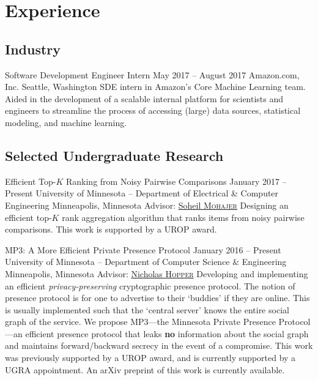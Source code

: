 \section{Experience}
\subsection{Industry}
\block
  {Software Development Engineer Intern}
  {May 2017 -- August 2017}
  {Amazon.com, Inc.}
  {Seattle, Washington}
  {}
  {
    SDE intern in Amazon's Core Machine Learning team. Aided in the development
    of a scalable internal platform for scientists and engineers to streamline
    the process of accessing (large) data sources, statistical modeling, and
    machine learning.
  }

\subsection{Selected Undergraduate Research}
\block
  {Efficient Top-\boldmath$K$ Ranking from Noisy Pairwise Comparisons}
  {January 2017 -- Present}
  {University of Minnesota -- Department of Electrical \& Computer Engineering}
  {Minneapolis, Minnesota}
  {Advisor: \href{\soheil}{Soheil \textsc{Mohajer}}}
  {
    Designing an efficient top-$K$ rank aggregation algorithm that ranks items
    from noisy pairwise comparisons.  This work is supported by a UROP award.
  }

\block
  {MP3: A More Efficient Private Presence Protocol}
  {January 2016 -- Present}
  {University of Minnesota -- Department of Computer Science \& Engineering}
  {Minneapolis, Minnesota}
  {Advisor: \href{\hoppernj}{Nicholas \textsc{Hopper}}}
  {
    Developing and implementing an efficient \emph{privacy-preserving}
    cryptographic presence protocol. The notion of presence protocol is for one
    to advertise to their `buddies' if they are online. This is usually
    implemented such that the `central server' knows the entire social graph of
    the service. We propose MP3---the Minnesota Private Presence Protocol---an
    efficient presence protocol that leaks \textbf{no} information about the
    social graph and maintains forward/backward secrecy in the event of a
    compromise.  This work was previously supported by a UROP award, and is
    currently supported by a UGRA appointment. An arXiv preprint of this work is
    currently available.
  }

